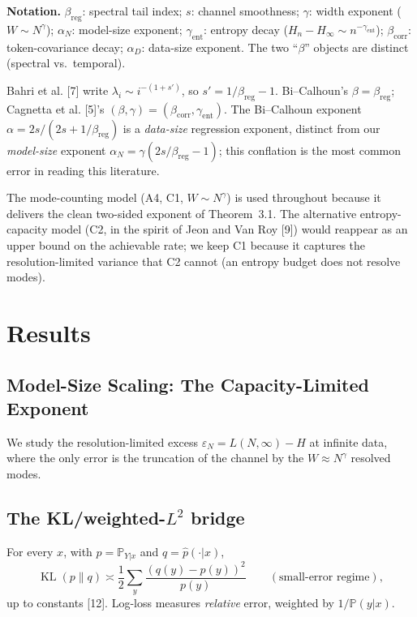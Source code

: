 \documentclass[entropy,article,submit,moreauthors,pdftex]{mdpi}
\newcommand{\eps}{\varepsilon}
\newcommand{\KL}{\operatorname{KL}}
\newcommand{\Prob}{\mathbb{P}}
\begin{document}
\noindent\textbf{Notation.}
$\beta_{\mathrm{reg}}$: spectral tail index;
$s$: channel smoothness;
$\gamma$: width exponent ($W\!\sim\!N^{\gamma}$);
$\alpha_N$: model-size exponent;
$\gamma_{\mathrm{ent}}$: entropy decay ($H_n\!-\!H_\infty\!\sim\!n^{-\gamma_{\mathrm{ent}}}$);
$\beta_{\mathrm{corr}}$: token-covariance decay;
$\alpha_D$: data-size exponent.  The two ``$\beta$'' objects are distinct
(spectral vs.\ temporal).

\begin{remark}
\label{rem:registry}
Bahri et al. [7] write $\lambda_i\sim i^{-(1+s')}$, so
$s'=1/\beta_{\mathrm{reg}}-1$. Bi--Calhoun's $\beta=\beta_{\mathrm{reg}}$;
Cagnetta et al. [5]'s $(\beta,\gamma)=(\beta_{\mathrm{corr}},\gamma_{\mathrm{ent}})$.
The Bi--Calhoun exponent $\alpha=2s/(2s+1/\beta_{\mathrm{reg}})$ is a
\emph{data-size} regression exponent, distinct from our \emph{model-size}
exponent $\alpha_N=\gamma(2s/\beta_{\mathrm{reg}}-1)$; this conflation is the most
common error in reading this literature.
\end{remark}

\begin{remark}
\label{rem:capacity}
The mode-counting model (A4, C1, $W\!\sim\!N^{\gamma}$) is used throughout because
it delivers the clean two-sided exponent of Theorem~3.1. The
alternative entropy-capacity model (C2, in the spirit of
Jeon and Van Roy [9]) would reappear as an upper bound on the achievable
rate; we keep C1 because it captures the resolution-limited variance that C2
cannot (an entropy budget does not resolve modes).
\end{remark}


\section{Results}
\label{sec:results}

\subsection{Model-Size Scaling: The Capacity-Limited Exponent}
\label{sec:modelsize}

We study the resolution-limited excess $\eps_N = L(N,\infty)-H$ at infinite
data, where the only error is the truncation of the channel by the $W\!\approx\!
N^\gamma$ resolved modes.

\subsection{The KL/weighted-$L^2$ bridge}
\begin{lemma}
\label{lem:bridge}
For every $x$, with $p=\Prob_{Y|x}$ and $q=\hat p(\cdot|x)$,
\begin{equation}
  \KL(p\|q) \asymp \frac12 \sum_y \frac{(q(y)-p(y))^2}{p(y)}
  \qquad (\text{small-error regime}),
  \label{eq:bridge}
\end{equation}
up to constants [12].  Log-loss measures \emph{relative} error,
weighted by $1/\Prob(y|x)$.
\end{lemma}
\end{document}
